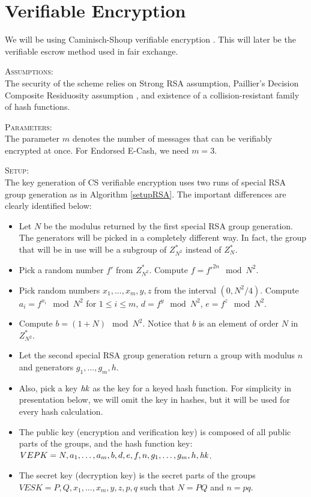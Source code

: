 \section{Verifiable Encryption}
We will be using Caminisch-Shoup verifiable encryption \cite{csVE}. This will later be the verifiable escrow method used in fair exchange.

\textsc{Assumptions}:\\
The security of the scheme relies on Strong RSA assumption, Paillier's Decision Composite Residuosity assumption \cite{paillierENC}, and existence of a collision-resistant family of hash functions.


\textsc{Parameters}:\\
The parameter $m$ denotes the number of messages that can be verifiably encrypted at once. For Endorsed E-Cash, we need $m=3$.



\textsc{Setup}:\\
The key generation of CS verifiable encryption uses two runs of special RSA group generation as in Algorithm \ref{setupRSA}. The important differences are clearly identified below:
\begin{itemize}
\item Let $N$ be the modulus returned by the first special RSA group generation. The generators will be picked in a completely different way. In fact, the group that will be in use will be a subgroup of $Z_{N^2}^{*}$ instead of $Z_{N}^{*}$.
\item Pick a random number $f'$ from $Z_{N^2}^{*}$. Compute $f = f'^{2n} \mod N^2$.
\item Pick random numbers $x_1,\ldots,x_m,y,z$ from the interval $(0,N^2 / 4)$. Compute $a_i = f^{x_i} \mod N^2$ for $1 \leq i \leq m$, $d = f^{y} \mod N^2$, $e = f^{z} \mod N^2$.
\item Compute $b = (1+N) \mod N^2$. Notice that $b$ is an element of order $N$ in $Z_{N^2}^{*}$.
\\
\item Let the second special RSA group generation return a group with modulus $n$ and generators $g_1,\ldots,g_m,h$.
\\
\item Also, pick a key $\mathit{hk}$ as the key for a keyed hash function. For simplicity in presentation below, we will omit the key in hashes, but it will be used for every hash calculation.
\\
\item The public key (\ie encryption and verification key) is composed of all public parts of the groups, and the hash function key: $VEPK = N,a_1,\ldots,a_m,b,d,e,f,n,g_1,\ldots,g_m,h,\mathit{hk}$.
\item The secret key (\ie decryption key) is the secret parts of the groups $VESK = P,Q,x_1,\ldots,x_m,y,z,p,q$ such that $N=PQ$ and $n=pq$.
\end{itemize}


